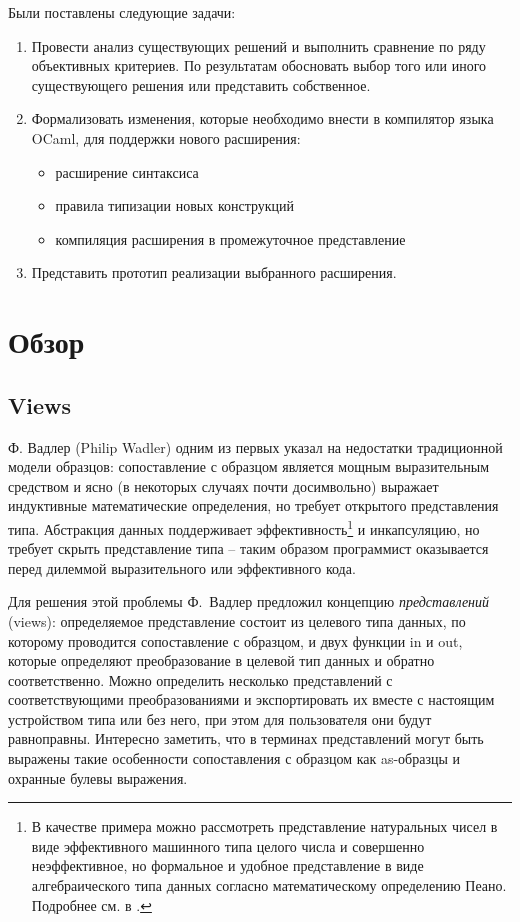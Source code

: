 \noindent Были поставлены следующие задачи:

\begin{enumerate}
	\item Провести анализ существующих решений и выполнить сравнение по ряду объективных критериев. По результатам обосновать выбор того или иного существующего решения или представить собственное.
	\item Формализовать изменения, которые необходимо внести в компилятор языка OCaml, для поддержки нового расширения:
  
  \begin{itemize}
  \item расширение синтаксиса
  \item правила типизации новых конструкций
  \item компиляция расширения в промежуточное представление
  \end{itemize}
  
  \item Представить прототип реализации выбранного расширения.
\end{enumerate}

\section{Обзор}

\subsection{Views}
Ф. Вадлер (Philip Wadler) \cite{wadler1987views} одним из первых указал на недостатки традиционной модели образцов: сопоставление с образцом является мощным выразительным средством и ясно (в некоторых случаях почти досимвольно) выражает индуктивные математические определения, но требует открытого представления типа. Абстракция данных поддерживает \mbox{эффективность}\footnote{В качестве примера можно рассмотреть представление натуральных чисел в виде эффективного машинного типа целого числа и совершенно неэффективное, но формальное и удобное представление в виде алгебраического типа данных согласно математическому определению Пеано. Подробнее см. в \cite{wadler1987views}.} и инкапсуляцию, но требует скрыть представление типа -- таким образом программист оказывается перед дилеммой выразительного или эффективного кода. 

Для решения этой проблемы Ф.~Вадлер предложил концепцию \textit{представлений} (views): определяемое представление состоит из целевого типа данных, по которому проводится сопоставление с образцом, и двух функции in и out, которые определяют преобразование в  целевой тип данных и обратно соответственно. Можно определить несколько представлений с соответствующими преобразованиями и экспортировать их вместе с настоящим устройством типа или без него, при этом для пользователя они будут равноправны. Интересно заметить, что в терминах представлений могут быть выражены такие особенности сопоставления с образцом как as-образцы и охранные булевы выражения.

